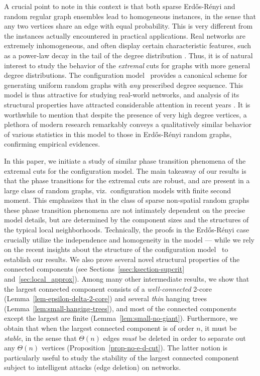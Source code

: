 \documentclass[11pt,a4paper, reqno]{article}
\numberwithin{equation}{section}
\numberwithin{equation}{section}
\newcommand{\1}{\ensuremath{\mathbbm{1}}}
\numberwithin{equation}{section}
\numberwithin{theorem}{section}
\begin{document}
A crucial point to note in this context is that both sparse Erd\H{o}s-R\'enyi and random regular graph ensembles lead to homogeneous instances, in the sense that any two vertices share an edge with equal probability. 
This is very different from the instances actually encountered in practical applications. 
Real networks are extremely inhomogeneous, and often display certain characteristic features, such as  a power-law decay in the tail of the degree distribution {\cite{SFFF03,FFF99,BA99,AB02,RGCN1}}. 
Thus, it is of natural interest to study the behavior of the \emph{extremal} cuts for graphs with more general degree distributions. 
The configuration model~\cite{B80,MR95} provides a canonical scheme for generating uniform random graphs with \emph{any} prescribed degree sequence. 
This model is thus attractive for studying real-world networks, and analysis of its structural properties have attracted considerable attention in recent years \cite{MR95,J08,J09,J09b,JL07,JL09}. 
It is worthwhile to mention that despite the presence of very high degree vertices, a plethora of modern research remarkably conveys a qualitatively similar behavior of various statistics in this model to those in Erd\H{o}s-R\'enyi random graphs, confirming empirical evidences.




In this paper, we initiate a study of similar phase transition phenomena of the extremal cuts for the configuration model.
The main takeaway of our results is that the phase transitions for the extremal cuts are robust, and are present in a large class of random graphs, viz.~configuration models with finite second moment. 
This emphasizes that in the class of sparse non-spatial random graphs these phase transition phenomena are not intimately dependent on the precise model details, but are determined by the component sizes and the structures of the typical local neighborhoods.  
Technically, the proofs in the Erd\H{o}s-R\'enyi case crucially utilize the independence and homogeneity in the model --- while 
we rely on the recent insights about the structure of the configuration model~\cite{J08, J09b, JL07,JL09}
to establish our results.
We also prove several novel structural properties of the connected components (see Sections~\ref{ssec:ksection-supcrit} and~\ref{sec:local_approx}).
Among many other intermediate results, we show that the largest connected component consists of a \emph{well-connected} 2-core (Lemma~\ref{lem-epsilon-delta-2-core}) and several \emph{thin} hanging trees (Lemma~\ref{lem:small-hanging-trees}), and most of the connected components except the largest are finite (Lemma~\ref{lem:small-no-giant}).
Furthermore, we obtain that when the largest connected component is of order $n$, it must be \emph{stable}, in the sense that $\Theta(n)$ edges \emph{must} be deleted in order to separate out any $\Theta(n)$ vertices (Proposition~\ref{prop-no-e-d-cut}).
The latter notion is particularly useful to study the stability of the largest connected component subject to intelligent attacks (edge deletion) on networks. 
\end{document}
